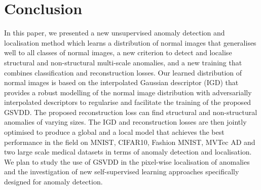 \documentclass[final]{cvpr}
\begin{document}
\section{Conclusion}

In this paper, we presented a new unsupervised anomaly detection and localisation method which learns a distribution of normal images that generalises well to all classes of normal images, a new criterion to detect and localise structural and non-structural multi-scale anomalies, and a new training that combines classification and reconstruction losses.
Our learned distribution of normal images is based on the interpolated Gaussian descriptor (IGD) that provides a robust modelling of the normal image distribution with adversarially interpolated descriptors to regularise and facilitate the training of the proposed GSVDD.  
The proposed reconstruction loss can find structural and non-structural anomalies of varying sizes.
The IGD and reconstruction losses are then jointly optimised to produce a global and a local model that achieves the best performance in the field on MNIST, CIFAR10, Fashion MNIST, MVTec AD and two large scale medical datasets in terms of anomaly detection and localisation. 
We plan to study the use of GSVDD in the pixel-wise localisation of anomalies and the investigation of new self-supervised learning approaches specifically designed for anomaly detection.













\newpage
{\small


}
\end{document}
